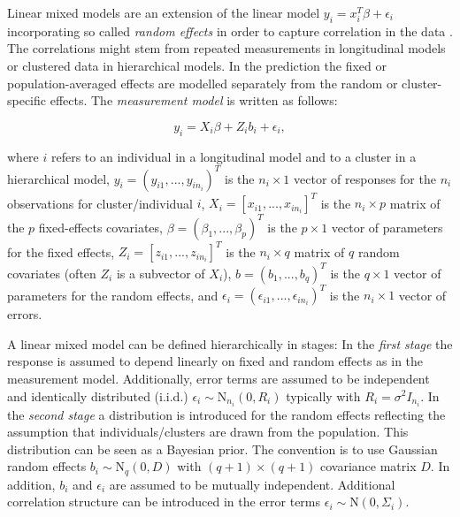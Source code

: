 \documentclass[12pt]{article}
\begin{document}
Linear mixed models are an extension of the linear model $y_i = x^T_i\beta +\epsilon_i$ incorporating so called \textit{random effects} in order to capture correlation in the data \cite{fahrmeir2013regression}. The correlations might stem from repeated measurements in longitudinal models or clustered data in hierarchical models. In the prediction the fixed or population-averaged effects are modelled separately from the random or cluster-specific effects. The \textit{measurement model} is written as follows:

$$y_i = X_i \beta + Z_i b_i + \epsilon_i,$$

where $i$ refers to an individual in a longitudinal model and to a cluster in a
hierarchical model, $y_i = ( y_{i1},...,y_{in_i} )^T$ is the $n_i \times 1$ vector of responses for the $n_i$ observations for cluster/individual $i$, $X_i = \left[ x_{i1},..., x_{in_i}\right]^T$ is the $n_i \times p$ matrix of the $p$ fixed-effects covariates, $\beta = (\beta_1,...,\beta_p)^T$ is the $p\times1$ vector of parameters for the fixed effects, $Z_i = \left[z_{i1},...,z_{in_i}\right]^T$ is the $n_i\times q$ matrix of $q$ random covariates (often $Z_i$ is a subvector of $X_i$), $b = (b_1,...,b_q)^T$ is the $q\times1$ vector of parameters for the random effects, and $\epsilon_i = (\epsilon_{i1},...,\epsilon_{in_i})^T$ is the $n_i\times1$ vector of errors. 

A linear mixed model can be defined hierarchically in stages: 
In the \textit{first stage} the response is assumed to depend linearly on fixed and random effects as in the measurement model. Additionally, error terms are assumed to be independent and identically distributed (i.i.d.) $\epsilon_i \sim \mathrm{N}_{n_i}(0,R_i)$ typically with $R_i=\sigma^2 I_{n_i}$. 
In the \textit{second stage} a distribution is introduced for the random effects reflecting the assumption that individuals/clusters are drawn from the population.
This distribution can be seen as a Bayesian prior. The convention is to use Gaussian random effects $b_i \sim \mathrm{N}_q(0,D)$ with $(q{+}1)\times (q{+}1)$ covariance matrix $D$. In addition, $b_i$ and $\epsilon_i$ are assumed to be mutually independent. 
Additional correlation structure can be introduced in the error terms $\epsilon_i \sim \mathrm{N}(0, \Sigma_i)$.
\end{document}
